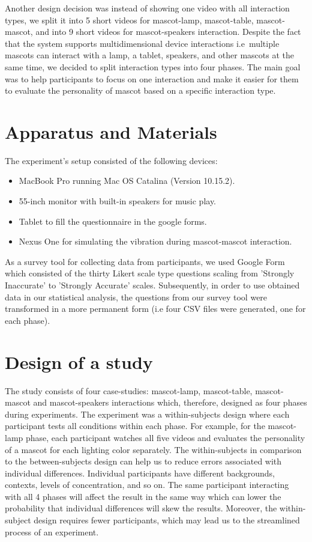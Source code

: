Another design decision was instead of showing one video with all interaction types,
we split it into 5 short videos for mascot-lamp, mascot-table, mascot-mascot,
and into 9 short videos for mascot-speakers interaction.
Despite the fact that the system supports multidimensional device interactions
i.e\ multiple mascots can interact with a lamp, a tablet, speakers, and other mascots at the same time,
we decided to split interaction types into four phases.
The main goal was to help participants to focus on one interaction and make
it easier for them to evaluate the personality of mascot based on a specific interaction type.

\section{Apparatus and Materials}
\label{sec:apparatus-and-materials}
The experiment’s setup consisted of the following devices:
\begin{itemize}
  \item MacBook Pro running Mac OS Catalina (Version 10.15.2).
  \item 55-inch monitor with built-in speakers for music play.
  \item Tablet to fill the questionnaire in the google forms.
  \item Nexus One for simulating the vibration during mascot-mascot interaction.
\end{itemize}

As a survey tool for collecting data from participants, we used Google Form which consisted
of the thirty Likert scale type questions scaling from 'Strongly Inaccurate' to 'Strongly Accurate' scales.
Subsequently, in order to use obtained data in our statistical analysis, the questions
from our survey tool were transformed in a more permanent form (i.e four CSV files were generated, one for each phase).

\section{Design of a study}
\label{sec:design-of-a-study}

The study consists of four case-studies: mascot-lamp, mascot-table, mascot-mascot and mascot-speakers
interactions which, therefore, designed as four phases during experiments.
The experiment was a within-subjects design where each participant tests all conditions within each phase.
For example, for the mascot-lamp phase, each participant watches all five videos and
evaluates the personality of a mascot for each lighting color separately.
The within-subjects in comparison to the between-subjects design can help us to
reduce errors associated with individual differences.
Individual participants have different backgrounds, contexts, levels of concentration, and so on.
The same participant interacting with all 4 phases will affect the result in the same way
which can lower the probability that individual differences will skew the results.
Moreover, the within-subject design requires fewer participants, which may lead
us to the streamlined process of an experiment.

